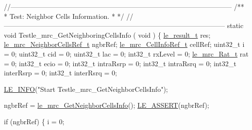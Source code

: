 \begin{DoxyCodeInclude}
\textcolor{comment}{//--------------------------------------------------------------------------------------------------}\textcolor{comment}{}
\textcolor{comment}{/**}
\textcolor{comment}{ * Test: Neighbor Cells Information.}
\textcolor{comment}{ *}
\textcolor{comment}{ */}
\textcolor{comment}{//--------------------------------------------------------------------------------------------------}
\textcolor{keyword}{static} \textcolor{keywordtype}{void} Testle\_mrc\_GetNeighboringCellsInfo
(
    \textcolor{keywordtype}{void}
)
\{
    \hyperlink{le__basics_8h_a1cca095ed6ebab24b57a636382a6c86c}{le\_result\_t} res;
    \hyperlink{le__mrc__interface_8h_a672ea94ad892bb95f43836b5fbd24188}{le\_mrc\_NeighborCellsRef\_t} ngbrRef;
    \hyperlink{le__mrc__interface_8h_a8fbb2523c254ba473a3f59efa452355e}{le\_mrc\_CellInfoRef\_t} cellRef;
    uint32\_t i = 0;
    uint32\_t cid = 0;
    uint32\_t lac = 0;
    int32\_t rxLevel = 0;
    \hyperlink{le__mrc__interface_8h_aaf23906c37ad59fb96a8a48f7fab5b43}{le\_mrc\_Rat\_t} rat = 0;
    int32\_t ecio = 0;
    int32\_t intraRsrp = 0;
    int32\_t intraRsrq = 0;
    int32\_t interRsrp = 0;
    int32\_t interRsrq = 0;

    \hyperlink{le__log_8h_a23e6d206faa64f612045d688cdde5808}{LE\_INFO}(\textcolor{stringliteral}{"Start Testle\_mrc\_GetNeighborCellsInfo"});

    ngbrRef = \hyperlink{le__mrc__interface_8h_a8d44fe46e61f3399c5e0dd6002b042ae}{le\_mrc\_GetNeighborCellsInfo}();
    \hyperlink{le__log_8h_ac0dbbef91dc0fed449d0092ff0557b39}{LE\_ASSERT}(ngbrRef);

    \textcolor{keywordflow}{if} (ngbrRef)
    \{
        i = 0;


\end{DoxyCodeInclude}
